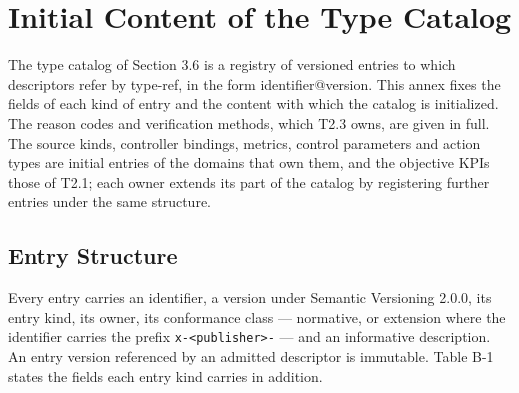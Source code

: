 
\hypertarget{annex-b-initial-content-of-the-type-catalog}{%
\section{Initial Content of the Type Catalog}\label{annex-b-initial-content-of-the-type-catalog}}

The type catalog of Section 3.6 is a registry of versioned entries to
which descriptors refer by type-ref, in the form identifier@version.
This annex fixes the fields of each kind of entry and the content with
which the catalog is initialized. The reason codes and verification
methods, which T2.3 owns, are given in full. The source kinds,
controller bindings, metrics, control parameters and action types are
initial entries of the domains that own them, and the objective KPIs
those of T2.1; each owner extends its part of the catalog by registering
further entries under the same structure.

\hypertarget{b.1-entry-structure}{%
\subsection{Entry Structure}\label{b.1-entry-structure}}

Every entry carries an identifier, a version under Semantic Versioning
2.0.0, its entry kind, its owner, its conformance class --- normative,
or extension where the identifier carries the prefix
\texttt{x-\textless{}publisher\textgreater{}-} --- and an informative
description. An entry version referenced by an admitted descriptor is
immutable. Table B-1 states the fields each entry kind carries in
addition.

